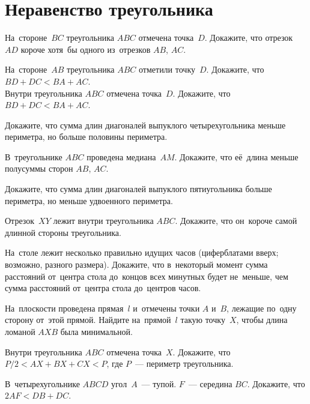 

\section*{Неравенство треугольника}


\begin{problems}

\item
На~стороне~$BC$ треугольника $ABC$ отмечена точка~$D$.
Докажите, что отрезок~$AD$ короче хотя~бы одного из~отрезков $AB$, $AC$.

\item
\sbp
На~стороне~$AB$ треугольника $ABC$ отметили точку~$D$.
Докажите, что $BD + DC < BA + AC$.
\\
\sbp
Внутри треугольника $ABC$ отмечена точка~$D$.
Докажите, что $BD + DC < BA + AC$.

\item
Докажите, что сумма длин диагоналей выпуклого четырехугольника меньше
периметра, но больше половины периметра.

\item
В~треугольнике $ABC$ проведена медиана~$AM$.
Докажите, что её~длина меньше полусуммы сторон $AB$, $AC$.

\item
Докажите, что сумма длин диагоналей выпуклого пятиугольника больше периметра,
но меньше удвоенного периметра.

\item
Отрезок~$XY$ лежит внутри треугольника $ABC$.
Докажите, что он~короче самой длинной стороны треугольника.

\item
На~столе лежит несколько правильно идущих часов (циферблатами вверх; возможно,
разного размера).
Докажите, что в~некоторый момент сумма расстояний от~центра стола до~концов
всех минутных будет не~меньше, чем сумма расстояний от~центра стола до~центров
часов.

\item
На~плоскости проведена прямая~$l$ и~отмечены точки $A$ и~$B$, лежащие по~одну
сторону от~этой прямой.
Найдите на~прямой~$l$ такую точку~$X$, чтобы длина ломаной $AXB$ была
минимальной.

\item
Внутри треугольника $ABC$ отмечена точка~$X$.
Докажите, что $P / 2 < AX + BX + CX < P$, где $P$~--- периметр треугольника.

\item
В~четырехугольнике $ABCD$ угол~$A$~--- тупой.
$F$~--- середина $BC$.
Докажите, что $2 AF < DB + DC$.

\end{problems}

